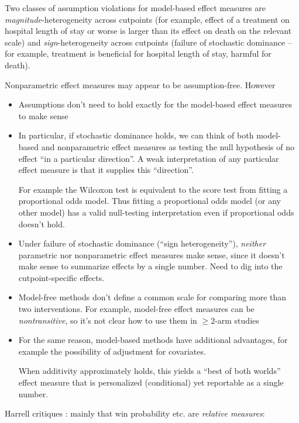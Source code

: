 \documentclass[
  11pt,
  fleqn
]{article}
\begin{document}
Two classes of assumption violations for model-based effect measures
are \emph{magnitude}-heterogeneity across cutpoints (for example,
  effect of a treatment on hospital length of stay or worse is larger
  than its effect on
death on the relevant scale) and
\emph{sign}-heterogeneity
across cutpoints (failure of stochastic dominance -- for example,
treatment is beneficial for hospital length of stay, harmful for death).

Nonparametric effect measures may appear to be assumption-free. However

\begin{itemize}
  \item Assumptions don't need to hold exactly for the model-based
    effect measures to make sense
  \item In particular, if stochastic dominance holds, we can think of
    both model-based and nonparametric effect measures as
    testing the null hypothesis of no effect ``in a particular
    direction''. A weak interpretation of any particular
    effect measure
    is that it supplies this ``direction''.

    For example the Wilcoxon test is
    equivalent to the score test from fitting a proportional odds model.
    Thus fitting a proportional odds model (or any other model) has a
    valid null-testing
    interpretation even if proportional odds doesn't hold.
  \item Under failure of stochastic dominance (``sign
    heterogeneity''), \emph{neither} parametric nor nonparametric
    effect measures make sense, since it doesn't make sense to
    summarize effects by a single number. Need to dig into the
    cutpoint-specific effects.
  \item Model-free methods don't define a common scale for comparing
    more than two interventions. For example, model-free effect
    measures can be \emph{nontransitive}, so it's not clear how to
    use them in $\geq 2$-arm studies
  \item For the same reason, model-based methods have additional
    advantages, for example
    the possibility of adjustment for covariates.

    When additivity approximately holds, this yields a ``best of both
    worlds'' effect measure that is
    personalized (conditional) yet reportable as a single
    number.
\end{itemize}

Harrell critiques \citep{harrellOverviewCompositeOutcome2024,
harrellRareDegenerativeDiseases2024, harrellViewsCompositeOutcome}: mainly that
win probability etc. are \emph{relative measures}:
\end{document}
